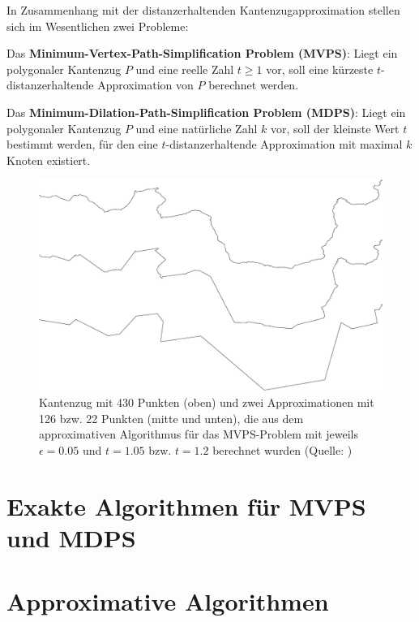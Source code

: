 \documentclass[11pt]{article}
\begin{document}
	In Zusammenhang mit der distanzerhaltenden Kantenzugapproximation stellen sich im Wesentlichen zwei Probleme:
	
	\noindent Das \textbf{Minimum-Vertex-Path-Simplification Problem (MVPS)}: Liegt ein polygonaler Kantenzug $P$ und eine reelle Zahl $t \geq 1$ vor, soll eine kürzeste $t$-distanzerhaltende Approximation von $P$ berechnet werden.
	
	\noindent Das \textbf{Minimum-Dilation-Path-Simplification Problem (MDPS)}: Liegt ein polygonaler Kantenzug $P$ und eine natürliche Zahl $k$ vor, soll der kleinste Wert $t$ bestimmt werden, für den eine $t$-distanzerhaltende Approximation mit maximal $k$ Knoten existiert.

    \begin{figure}
    	\centering
    	\begin{minipage}{.8\linewidth}
    		 \includegraphics[scale=0.15]{approximation_example}
    	\end{minipage}
    	\caption{Kantenzug mit 430 Punkten (oben) und zwei Approximationen mit 126 bzw. 22 Punkten (mitte und unten), die aus dem approximativen Algorithmus für das MVPS-Problem mit jeweils $\epsilon = 0.05$ und $t = 1.05$ bzw. $t = 1.2$ berechnet wurden (Quelle: \cite{gudmundsson})}
    \end{figure}

    \section{Exakte Algorithmen für MVPS und MDPS}
    \label{sec:exact}
    
    
    \section{Approximative Algorithmen}
    \label{sec:approximative}
    
\end{document}
